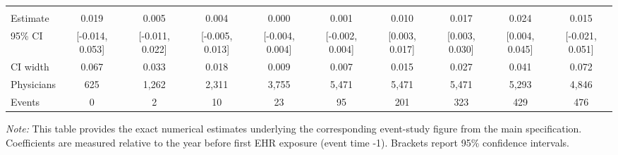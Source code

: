 \begin{landscape}
\begin{table}[!h]
\begin{tabular}[t]{lccccccccc}
\addlinespace[0.3em]
\multicolumn{10}{l}{\textbf{All}}\\
\hspace{1em}Estimate & 0.019 & 0.005 & 0.004 & 0.000 & 0.001 & 0.010 & 0.017 & 0.024 & 0.015\\
\hspace{1em}95\% CI & {}[-0.014, 0.053] & {}[-0.011, 0.022] & {}[-0.005, 0.013] & {}[-0.004, 0.004] & {}[-0.002, 0.004] & {}[0.003, 0.017] & {}[0.003, 0.030] & {}[0.004, 0.045] & {}[-0.021, 0.051]\\
\hspace{1em}CI width & 0.067 & 0.033 & 0.018 & 0.009 & 0.007 & 0.015 & 0.027 & 0.041 & 0.072\\
\hspace{1em}Physicians & 625 & 1,262 & 2,311 & 3,755 & 5,471 & 5,471 & 5,471 & 5,293 & 4,846\\
\hspace{1em}Events & 0 & 2 & 10 & 23 & 95 & 201 & 323 & 429 & 476\\
\bottomrule
\end{tabular}
\begin{tablenotes}
\item \textit{Note: } This table provides the exact numerical estimates underlying the corresponding event-study figure from the main specification. Coefficients are measured relative to the year before first EHR exposure (event time -1). Brackets report 95\% confidence intervals. 
\end{tablenotes}
\end{table}
\end{landscape}
